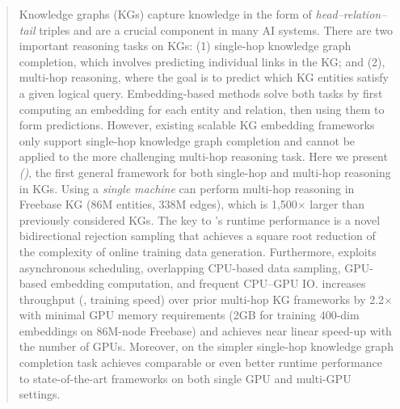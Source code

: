 \begin{abstract}
Knowledge graphs (KGs) capture knowledge in the form of  {\em head--relation--tail} triples and are a crucial component in many AI systems. There are two important reasoning tasks on KGs: (1) single-hop knowledge graph completion, which involves predicting individual links in the KG; and (2), multi-hop reasoning, where the goal is to predict which KG entities satisfy a given logical query. Embedding-based methods solve both tasks by first computing an embedding for each entity and relation, then using them to form predictions. However, existing scalable KG embedding frameworks only support single-hop knowledge graph completion and cannot be applied to the more challenging multi-hop reasoning task. Here we present {\em \modellong (\modelshort)}, the first general framework for both single-hop and multi-hop reasoning in KGs. Using a \emph{single machine} \modelshort can perform multi-hop reasoning in Freebase KG (86M entities, 338M edges), which is 1,500$\times$ larger than previously considered KGs. The key to \modelshort's runtime performance is a novel bidirectional rejection sampling that achieves a square root reduction of the complexity of online training data generation. Furthermore, \modelshort exploits asynchronous scheduling,  overlapping CPU-based data sampling, GPU-based embedding computation, and frequent CPU--GPU IO. \modelshort increases throughput (\ie, training speed) over prior multi-hop KG frameworks by 2.2$\times$ with minimal GPU memory requirements (2GB for training 400-dim embeddings on 86M-node Freebase) and achieves near linear speed-up with the number of GPUs.  Moreover, on the simpler single-hop knowledge graph completion task \modelshort achieves comparable or even better runtime performance to state-of-the-art frameworks on both single GPU and multi-GPU settings.
\end{abstract}